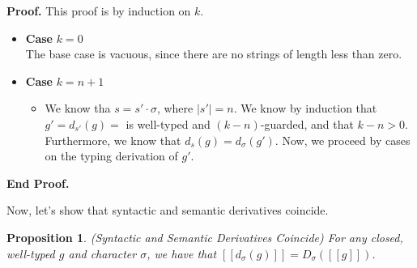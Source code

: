 \documentclass{article}
\newcommand{\interp}[1]{[\![{#1}]\!]}
\newcommand{\semderiv}[2]{D_{#1}({#2})}
\newcommand{\deriv}[2]{d_{#1}({#2})}
\newtheorem{prop}{Proposition}
\newenvironment{proof}{\noindent\textbf{Proof.}}
{\noindent\textbf{End Proof.}}
\newenvironment{caseblock}{\begin{itemize}}{\end{itemize}}
\newenvironment{case}[1]{\item \textbf{Case} {#1}\\}{}
\begin{document}
\begin{proof}
  This proof is by induction on $k$. 

  \begin{caseblock}
    \begin{case}{$k = 0$}
      The base case is vacuous, since there are no strings of length less than zero. 
    \end{case}

    \begin{case}{$k = n+1$}
      \begin{itemize}
      \item We know tha $s = s' \cdot \sigma$, where $|s'| = n$. We know by induction that 
        $g' = \deriv{s'}{g} = $ is well-typed and $(k - n)$-guarded, and that $k - n > 0$.  
        Furthermore, we know that $\deriv{s}{g} = \deriv{\sigma}{g'}$. Now, we proceed by 
        cases on the typing derivation of $g'$. 
      \end{itemize}
    \end{case}
  \end{caseblock}

\end{proof}






Now, let's show that syntactic and semantic derivatives coincide. 

\begin{prop}{(Syntactic and Semantic Derivatives Coincide)}
For any closed, well-typed $g$ and character $\sigma$, we have that
$\interp{\deriv{\sigma}{g}} = \semderiv{\sigma}{\interp{g}}$.
\end{prop}
\end{document}
